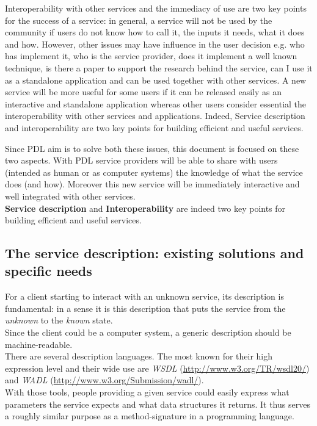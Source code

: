 \documentclass[a4paper,11pt] {ivoa}
\begin{document}
Interoperability with other services and the immediacy of use are two key points for the success of a service:
in general, a service will not be used by the community if users do not know how to call it, the inputs it needs, what it does and how. However, other issues may have influence in the user decision e.g. who has implement it, who is the service provider, does it implement a well known technique, is there a paper to support the research behind the service, can I use it as a standalone application and can be used together with other services. 
A new service will be more useful for some users if it can be released easily as an interactive and standalone application whereas other users consider essential the interoperability with other services and applications. 
Indeed, Service description and interoperability are two key points for building efficient and useful services. 

Since PDL aim is to solve both these issues, this document is focused on these two aspects. 
With PDL service providers will be able to share with users (intended as human or as computer systems) 
the knowledge of what the service does (and how).
Moreover this new service will be immediately interactive and well integrated with other services.\\

{\bf Service description} and {\bf Interoperability} are indeed two key points for building
efficient and useful services.

\subsection{The service description: existing solutions and specific needs}
For a client starting to interact with an unknown service, its description is fundamental: in a
sense it is this description that puts the service from the {\it unknown} to the {\it known}
state.\\
Since the client could be a computer system, a generic description should be machine-readable.\\

There are several description languages. The most known for their high expression level and their
wide use are \emph{WSDL} (\href{http://www.w3.org/TR/wsdl20/}{http://www.w3.org/TR/wsdl20/}) and
\textit{WADL} (\href{http://www.w3.org/Submission/wadl/}{http://www.w3.org/Submission/wadl/}).\\
With those tools, people providing a given service could easily express what parameters the service
expects and what data structures it returns. It thus serves a roughly similar purpose as a
method-signature in a programming language.\\
\end{document}
